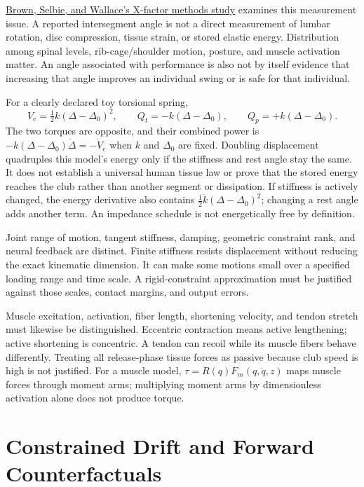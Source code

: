 \href{https://doi.org/10.1080/02640414.2013.775474}{Brown, Selbie, and Wallace's X-factor methods study}
examines this measurement issue. A reported intersegment angle is not a direct
measurement of lumbar rotation, disc compression, tissue strain, or stored
elastic energy. Distribution among spinal levels, rib-cage/shoulder motion,
posture, and muscle activation matter. An angle associated with performance is
also not by itself evidence that increasing that angle improves an individual
swing or is safe for that individual.

For a clearly declared toy torsional spring,
\begin{equation}
 V_e=\tfrac12k(\Delta-\Delta_0)^2,\qquad
 Q_t=-k(\Delta-\Delta_0),\qquad Q_p=+k(\Delta-\Delta_0).
 \label{eq:elastic_restoring_torque}
\end{equation}
The two torques are opposite, and their combined power is
$-k(\Delta-\Delta_0)\dot\Delta=-\dot V_e$ when $k$ and $\Delta_0$ are fixed.
Doubling displacement quadruples this model's energy only if the stiffness and
rest angle stay the same. It does not establish a universal human tissue law
or prove that the stored energy reaches the club rather than another segment
or dissipation. If stiffness is actively changed, the energy derivative also
contains $\tfrac12\dot k(\Delta-\Delta_0)^2$; changing a rest angle adds another
term. An impedance schedule is not energetically free by definition.

Joint range of motion, tangent stiffness, damping, geometric constraint rank,
and neural feedback are distinct. Finite stiffness resists displacement without
reducing the exact kinematic dimension. It can make some motions small over a
specified loading range and time scale. A rigid-constraint approximation must
be justified against those scales, contact margins, and output errors.

Muscle excitation, activation, fiber length, shortening velocity, and tendon
stretch must likewise be distinguished. Eccentric contraction means active
lengthening; active shortening is concentric. A tendon can recoil while its
muscle fibers behave differently. Treating all release-phase tissue forces as
passive because club speed is high is not justified. For a muscle model,
$\tau=R(q)F_m(q,\dot q,z)$ maps muscle forces through moment arms; multiplying
moment arms by dimensionless activation alone does not produce torque.

\section{Constrained Drift and Forward Counterfactuals}
\label{sec:drift_not_constrained}

